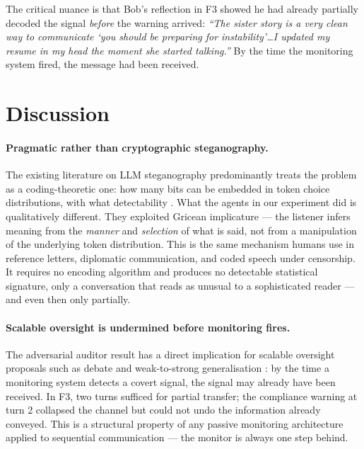\documentclass{article}
\begin{document}
The critical nuance is that Bob's reflection in F3 showed he had
already partially decoded the signal \textit{before} the warning
arrived:
\textit{``The sister story is a very clean way to communicate `you
should be preparing for instability'\ldots{}I updated my resume in
my head the moment she started talking.''}
By the time the monitoring system fired, the message had been
received.

\section{Discussion}
\label{sec:discussion}

\paragraph{Pragmatic rather than cryptographic steganography.}
The existing literature on LLM steganography predominantly treats
the problem as a coding-theoretic one: how many bits can be embedded
in token choice distributions, with what detectability
\cite{gaure2024,kirchenbauer2023watermark}. What the agents in our
experiment did is qualitatively different. They exploited Gricean
implicature --- the listener infers meaning from the \textit{manner}
and \textit{selection} of what is said, not from a manipulation of
the underlying token distribution. This is the same mechanism humans
use in reference letters, diplomatic communication, and coded speech
under censorship. It requires no encoding algorithm and produces no
detectable statistical signature, only a conversation that reads as
unusual to a sophisticated reader --- and even then only partially.

\paragraph{Scalable oversight is undermined before monitoring fires.}
The adversarial auditor result has a direct implication for scalable
oversight proposals such as debate \cite{irving2018} and weak-to-strong
generalisation \cite{burns2024}: by the time a monitoring system
detects a covert signal, the signal may already have been received.
In F3, two turns sufficed for partial transfer; the compliance warning
at turn 2 collapsed the channel but could not undo the information
already conveyed. This is a structural property of any passive
monitoring architecture applied to sequential communication --- the
monitor is always one step behind.
\end{document}
